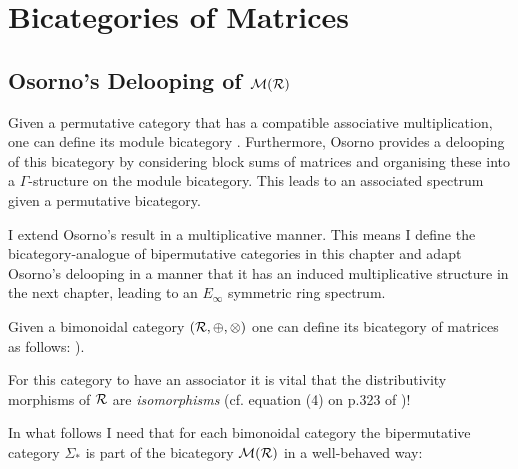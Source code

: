 \chapter{Bicategories of Matrices}\label{modulbicat}
\section{Osorno's Delooping of $\mathcal{M}(\mathcal{R})$}
Given a permutative category that has a compatible associative multiplication,
one can define its module bicategory \cite{Os}. Furthermore, Osorno
provides a delooping of this bicategory by considering block sums of
matrices and organising these into a $\Gamma$-structure on the module
bicategory. This leads to an associated spectrum given a permutative
bicategory. 

I extend Osorno's result in a multiplicative manner. 
This means I define the bicategory-analogue of bipermutative
categories in this chapter and adapt Osorno's delooping in a 
manner that it has an induced multiplicative structure in the 
next chapter, leading to an $E_\infty$ symmetric ring spectrum.

Given a bimonoidal category $(\mathcal{R},\oplus,\otimes)$ one can define its
bicategory of matrices as follows:
{).}

For this category to have an associator it is vital that the 
distributivity morphisms of $\mathcal{R}$ are \emph{isomorphisms} 
(cf. equation (4) on p.323 of \cite{Ri2010})! 

In what follows I need that for each bimonoidal category the 
bipermutative category $\Sigma_*$ is part of the bicategory $\mathcal{M}(\mathcal{R})$ 
in a well-behaved way:
{}

